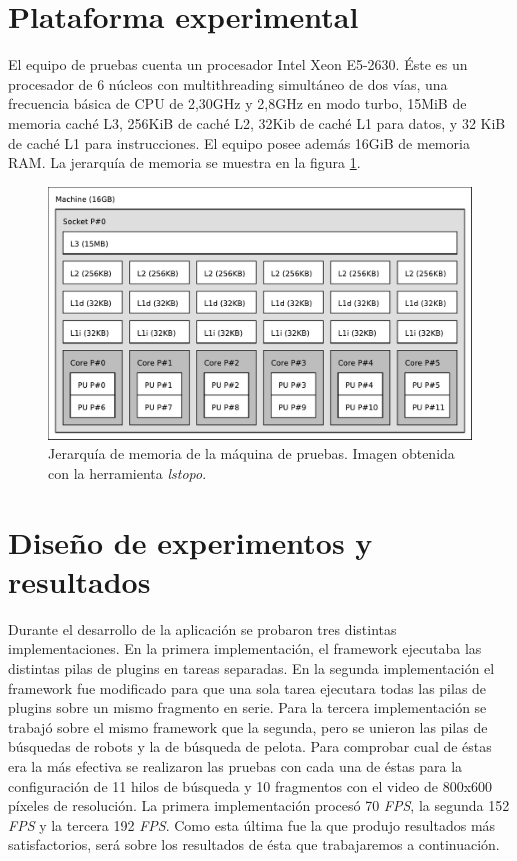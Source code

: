 \section{Plataforma experimental}

\label{plataformaExperimental}

El equipo de pruebas cuenta un procesador Intel Xeon E5-2630. Éste es un
procesador de 6 núcleos con multithreading simultáneo de dos vías, una
frecuencia básica de CPU de 2,30GHz y 2,8GHz en modo turbo, 15MiB de memoria
caché L3, 256KiB de caché L2, 32Kib de caché L1 para datos, y 32 KiB de caché L1
para instrucciones. El equipo posee además 16GiB de memoria RAM. La jerarquía de
memoria se muestra en la figura \ref{topoMemoria}.

\begin{figure}[!htb]

	\includegraphics[width=\textwidth]{img/topo.pdf}
	\caption{Jerarquía de memoria de la máquina de pruebas. Imagen obtenida
	con la herramienta \emph{lstopo}.}

	\label{topoMemoria}

\end{figure}

\section{Diseño de experimentos y resultados}

\label{resultados}

Durante el desarrollo de la aplicación se probaron tres distintas
implementaciones. En la primera implementación, el framework ejecutaba las
distintas pilas de plugins en tareas separadas. En la segunda implementación el
framework fue modificado para que una sola tarea ejecutara todas las pilas de
plugins sobre un mismo fragmento en serie. Para la tercera implementación se
trabajó sobre el mismo framework que la segunda, pero se unieron las pilas de
búsquedas de robots y la de búsqueda de pelota. Para comprobar cual de éstas era
la más efectiva se realizaron las pruebas con cada una de éstas para la
configuración de 11 hilos de búsqueda y 10 fragmentos con el video de 800x600
píxeles de resolución. La primera implementación procesó 70 \emph{FPS}, la
segunda 152 \emph{FPS} y la tercera 192 \emph{FPS}. Como esta última fue la que
produjo resultados más satisfactorios, será sobre los resultados de ésta que
trabajaremos a continuación.


